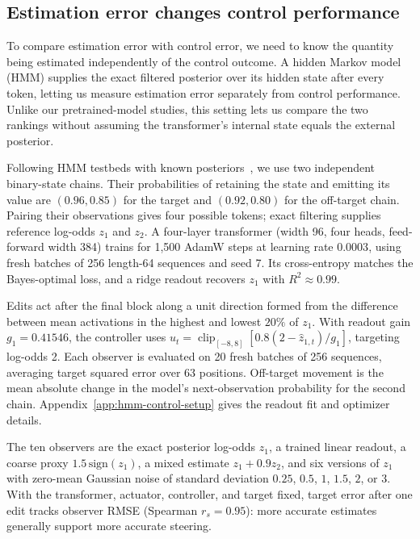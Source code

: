 \documentclass[sigconf,10pt,nonacm,balance=false]{acmart}
\begin{document}
\subsection{Estimation error changes control performance}\label{sec:result-control}
To compare estimation error with control error, we need to know the quantity being estimated independently of the control outcome. A hidden Markov model (HMM) supplies the exact filtered posterior over its hidden state after every token, letting us measure estimation error separately from control performance. Unlike our pretrained-model studies, this setting lets us compare the two rankings without assuming the transformer's internal state equals the external posterior.

Following HMM testbeds with known posteriors~\cite{agarwal2025geometry}, we use two independent binary-state chains. Their probabilities of retaining the state and emitting its value are $(0.96,0.85)$ for the target and $(0.92,0.80)$ for the off-target chain. Pairing their observations gives four possible tokens; exact filtering supplies reference log-odds $z_1$ and $z_2$. A four-layer transformer (width 96, four heads, feed-forward width 384) trains for 1,500 AdamW steps at learning rate $0.0003$, using fresh batches of 256 length-64 sequences and seed 7. Its cross-entropy matches the Bayes-optimal loss, and a ridge readout recovers $z_1$ with $R^2\approx0.99$.

Edits act after the final block along a unit direction formed from the difference between mean activations in the highest and lowest $20\%$ of $z_1$. With readout gain $g_1=0.41546$, the controller uses $u_t=\operatorname{clip}_{[-8,8]}[0.8(2-\widehat z_{1,t})/g_1]$, targeting log-odds 2. Each observer is evaluated on 20 fresh batches of 256 sequences, averaging target squared error over 63 positions. Off-target movement is the mean absolute change in the model's next-observation probability for the second chain. Appendix~\ref{app:hmm-control-setup} gives the readout fit and optimizer details.

The ten observers are the exact posterior log-odds $z_1$, a trained linear readout, a coarse proxy $1.5\,\mathrm{sign}(z_1)$, a mixed estimate $z_1+0.9z_2$, and six versions of $z_1$ with zero-mean Gaussian noise of standard deviation $0.25$, $0.5$, $1$, $1.5$, $2$, or $3$. With the transformer, actuator, controller, and target fixed, target error after one edit tracks observer RMSE (Spearman $r_s=0.95$): more accurate estimates generally support more accurate steering.
\end{document}
